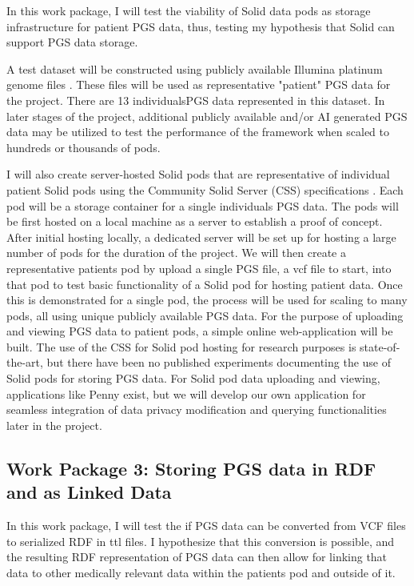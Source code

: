 \documentclass[runningheads]{llncs}
\begin{document}
In this work package, I will test the viability of Solid data pods as storage infrastructure for patient PGS data, thus, testing my hypothesis that Solid can support PGS data storage. 

A test dataset will be constructed using publicly available Illumina platinum genome files \cite{noauthor_platinum_nodate}. 
These files will be used as representative "patient" PGS data for the project. 
There are 13 individuals\textquotesingle  PGS data represented in this dataset. 
In later stages of the project, additional publicly available and/or AI generated PGS data may be utilized to test the performance of the framework when scaled to hundreds or thousands of pods. 

I will also create server-hosted Solid pods that are representative of individual patient Solid pods using the Community Solid Server (CSS) specifications \cite{css}. 
Each pod will be a storage container for a single individual\textquotesingle s PGS data. 
The pods will be first hosted on a local machine as a server to establish a proof of concept.
After initial hosting locally, a dedicated server will be set up for hosting a large number of pods for the duration of the project. 
We will then create a representative patient\textquotesingle s pod by upload a single PGS file, a vcf file to start, into that pod to test basic functionality of a Solid pod for hosting patient data. 
Once this is demonstrated for a single pod, the process will be used for scaling to many pods, all using unique publicly available PGS data. 
For the purpose of uploading and viewing PGS data to patient pods, a simple online web-application will be built.
The use of the CSS for Solid pod hosting for research purposes is state-of-the-art, but there have been no published experiments documenting the use of Solid pods for storing PGS data. 
For Solid pod data uploading and viewing, applications like Penny \cite{penny} exist, but we will develop our own application for seamless integration of data privacy modification and querying functionalities later in the project. 


\subsection{Work Package 3:  Storing PGS data in RDF and as Linked Data}

In this work package, I will test the if PGS data can be converted from VCF files to serialized RDF in ttl files. I hypothesize that this conversion is possible, and the resulting RDF representation of PGS data can then allow for linking that data to other medically relevant data within the patient\textquotesingle s pod and outside of it.
\end{document}
